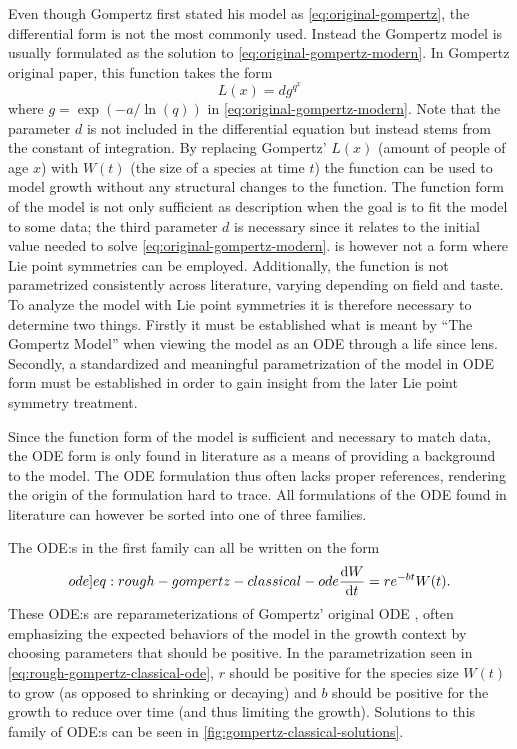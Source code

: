 Even though Gompertz first stated his model as \cref{eq:original-gompertz}, the differential form is not the most commonly used.
Instead the Gompertz model is usually formulated as the solution to \cref{eq:original-gompertz-modern}.
In Gompertz original paper, this function takes the form
\begin{equation} \label{eq:original-gompertz-solution}
  L(x) = d g^{q^x}
\end{equation}
where \(g = \exp(-a/\ln(q))\) in \cref{eq:original-gompertz-modern}.
Note that the parameter \(d\) is not included in the differential equation but instead stems from the constant of integration.
By replacing Gompertz' \(L(x)\) (amount of people of age \(x\)) with \(W(t)\) (the size of a species at time \(t\)) the function can be used to model growth without any structural changes to the function.
The function form of the model is not only sufficient as description when the goal is to fit the model to some data; the third parameter \(d\) is necessary since it relates to the initial value needed to solve \cref{eq:original-gompertz-modern}.
 is however not a form where Lie point symmetries can be employed.
Additionally, the function is not parametrized consistently across literature, varying depending on field and taste.
To analyze the model with Lie point symmetries it is therefore necessary to determine two things.
Firstly it must be established what is meant by \enquote{The Gompertz Model} when viewing the model as an ODE through a life since lens.
Secondly, a standardized and meaningful parametrization of the model in ODE form must be established in order to gain insight from the later Lie point symmetry treatment.

Since the function form of the model is sufficient and necessary to match data, the ODE form is only found in literature as a means of providing a background to the model.
The ODE formulation thus often lacks proper references, rendering the origin of the formulation hard to trace.
All formulations of the ODE found in literature can however be sorted into one of three families.

The ODE:s in the first family can all be written on the form
\begin{equation} \label[ode]{eq:rough-gompertz-classical-ode}
  \diff{W}{t} = r e^{-b t} W(t).
\end{equation}
These ODE:s are reparameterizations of Gompertz' original ODE , often emphasizing the expected behaviors of the model in the growth context by choosing parameters that should be positive.
In the parametrization seen in \cref{eq:rough-gompertz-classical-ode}, \(r\) should be positive for the species size \(W(t)\) to grow (as opposed to shrinking or decaying) and \(b\) should be positive for the growth to reduce over time (and thus limiting the growth).
Solutions to this family of ODE:s can be seen in \cref{fig:gompertz-classical-solutions}.

